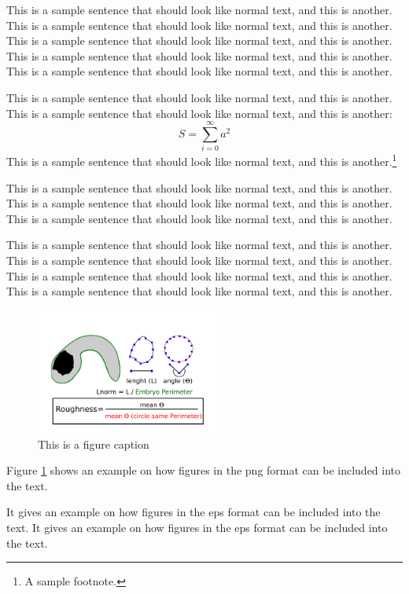 This is a sample sentence that should look like normal text, and this
is another. This is a sample sentence that should look like normal
text, and this is another. This is a sample sentence that should look
like normal text, and this is another. This is a sample sentence that
should look like normal text, and this is another. This is a sample
sentence that should look like normal text, and this is another. 

This is a sample sentence that should look like normal text, and this
is another. This is a sample sentence that should look like normal
text, and this is another:
\[ S = \sum_{i=0}^{\infty} a^2 \]
This is a sample sentence that should look like normal text, and this
is another.\footnote{A sample footnote.}

This is a sample sentence that should look like normal text, and this
is another. This is a sample sentence that should look like normal
text, and this is another. This is a sample sentence that should look
like normal text, and this is another.


This is a sample sentence that should look like normal text, and this
is another. This is a sample sentence that should look like normal
text, and this is another. This is a sample sentence that should look
like normal text, and this is another. This is a sample sentence that
should look like normal text, and this is another.

\begin{figure}[h]
  \includegraphics[width=6cm]{./Images/Fig.png}
  \centering
  \caption{This is a figure caption}
  \label{fig:Fig}
\end{figure}



Figure \ref{fig:Fig} shows an example on how figures in the 
png format can be included into the text.\par
It gives an example on how 
figures in the eps format can be included into the text. It gives 
an example on how figures in the eps format can be included into the text.
